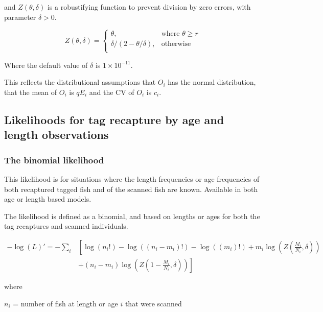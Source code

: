 and $Z \left(\theta,\delta \right)$ is a robustifying function to prevent division by zero errors, with parameter $\delta>0$.

\begin{equation}
	Z \left(\theta,\delta \right) = \begin{cases}
	\theta, & \text{where $\theta \ge r$} \\
	\delta/\left( 2-\theta/\delta \right), & \text{otherwise} \\
	\end{cases}
\end{equation}

Where the default value of $\delta$ is $1 \times 10^{-11}$.

This reflects the distributional assumptions that  $O_i$ has the normal distribution, that the mean of $O_i$ is $qE_i$  and the CV of $O_i$ is $c_i$.

\subsection{Likelihoods for tag recapture by age and length observations}
\subsubsection{The binomial likelihood }

This likelihood is for situations where the length frequencies or age frequencies of both recaptured tagged fish and of the scanned fish are known. Available in both age or length based models.

The likelihood is defined as a binomial, and based on lengths or ages for both the tag recaptures and scanned individuals. 

\begin{equation}
	\begin{split}
	-\log \left(L \right)'= -\sum\limits_i & \left[ \right. \log \left(n_i! \right) - \log \left(\left(n_i - m_i \right)! \right) - \log \left(\left(m_i \right)! \right) + m_i \log \left(Z\left(\frac{M_i}{N_i},\delta \right) \right) \\
	&+  \left(n_i - m_i \right)\log \left(Z\left(1 - \frac{M_i}{N_i},\delta\right) \right) \left. \right]
	\end{split}
\end{equation}

where

$n_i$ = number of fish at length or age $i$ that were scanned

